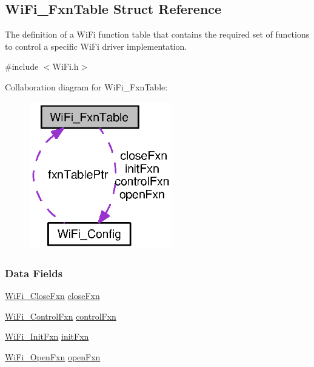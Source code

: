 \subsection{Wi\+Fi\+\_\+\+Fxn\+Table Struct Reference}
\label{struct_wi_fi___fxn_table}


The definition of a Wi\+Fi function table that contains the required set of functions to control a specific Wi\+Fi driver implementation.  




{\ttfamily \#include $<$Wi\+Fi.\+h$>$}



Collaboration diagram for Wi\+Fi\+\_\+\+Fxn\+Table\+:
\nopagebreak
\begin{figure}[H]
\begin{center}
\leavevmode
\includegraphics[width=177pt]{struct_wi_fi___fxn_table__coll__graph}
\end{center}
\end{figure}
\subsubsection*{Data Fields}
\begin{DoxyCompactItemize}
\item 
\hyperlink{_wi_fi_8h_a38017ed0e04ba2fb9a81cd3177c7d7b8}{Wi\+Fi\+\_\+\+Close\+Fxn} \hyperlink{struct_wi_fi___fxn_table_a8ba2076fccbb9723310c51b5b9d3f12c}{close\+Fxn}
\item 
\hyperlink{_wi_fi_8h_a2b33be721c0a64e9d4059f5318cf32f6}{Wi\+Fi\+\_\+\+Control\+Fxn} \hyperlink{struct_wi_fi___fxn_table_a79f8a5ec7b767b5e73bc3f5dc982dbdf}{control\+Fxn}
\item 
\hyperlink{_wi_fi_8h_ac7aed5d39515b94dc5b850b366c1c493}{Wi\+Fi\+\_\+\+Init\+Fxn} \hyperlink{struct_wi_fi___fxn_table_a38d5cdd22d785e50896870c40a0cea52}{init\+Fxn}
\item 
\hyperlink{_wi_fi_8h_a8f482785892cfecbe0799e844c2fb389}{Wi\+Fi\+\_\+\+Open\+Fxn} \hyperlink{struct_wi_fi___fxn_table_aa0119e93eb6b25b6323c0756e366c408}{open\+Fxn}
\end{DoxyCompactItemize}



